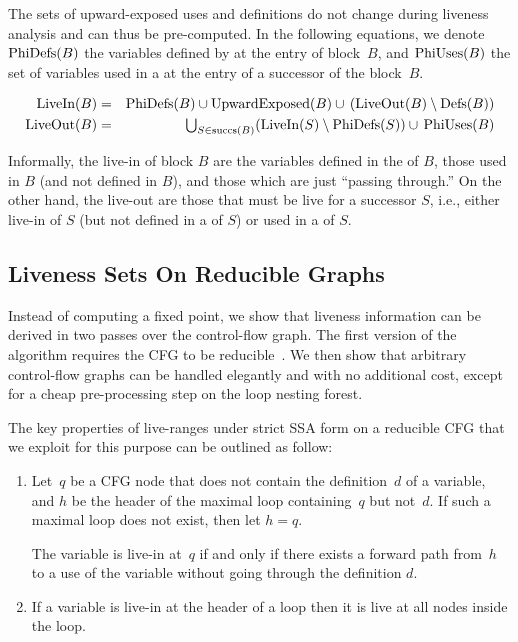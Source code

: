 The sets of upward-exposed uses and definitions do not change during liveness analysis and can thus be pre-computed.
%
In the following equations, we denote $\textrm{PhiDefs}(B)$ the variables defined by \phifuns at the entry of block~$B$, and $\textrm{PhiUses}(B)$ the set of variables used in a \phifun at the entry of a successor of the block~$B$.

\begin{eqnarray*}
	\textrm{LiveIn}(B) & = & \textrm{PhiDefs}(B) \cup \textrm{UpwardExposed}(B) \cup \,(\textrm{LiveOut}(B)\setminus \textrm{Defs}(B)) \\
	\textrm{LiveOut}(B)& = &
	\textstyle \bigcup_{S \in \textrm{succs}(B)} (\textrm{LiveIn}(S) \setminus
	\textrm{PhiDefs}(S)) \cup\, \textrm{PhiUses}(B)
\end{eqnarray*}

Informally, the live-in of block $B$ are the variables defined in the 
\phifuns of $B$, those used in $B$ (and not defined in $B$), and those 
which are just ``passing through.'' On the other hand, the live-out are 
those that must be live for a successor $S$, i.e., either live-in of $S$ 
(but not defined in a \phifun of $S$) or used in a \phifun of $S$.


\subsection{Liveness Sets On Reducible Graphs}
\label{sec:forreducible}

Instead of computing a fixed point, we show that liveness information can be derived in two passes over the control-flow graph.
The first version of the algorithm requires the CFG to be reducible~.
We then show that arbitrary control-flow graphs can be handled elegantly and with no additional cost, except for a cheap pre-processing step on the loop nesting forest.

The key properties of live-ranges under strict SSA form on a reducible CFG that 
we exploit for this purpose %
can be outlined as follow:
\begin{enumerate}
  \item
    Let~$q$ be a CFG node that does not contain the definition~$d$ of 
    a variable, and $h$ be the header of the maximal loop containing~$q$ 
    but not~$d$.
    If such a maximal loop does not exist, then let $h=q$.

    The variable is live-in at~$q$ if and only if there exists a forward path 
    from~$h$ to a use of the variable without going through the definition $d$.

  \item
    If a variable is live-in at the header of a loop then it is live at all 
    nodes inside the loop.
\end{enumerate}

